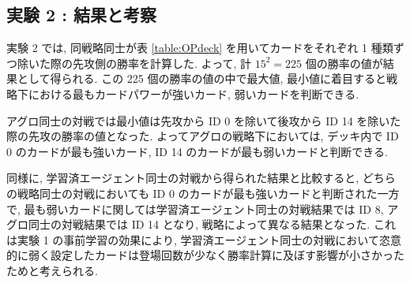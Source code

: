 \documentclass[twocolumn]{jarticle}     %
\begin{document}
         \subsection{実験 2 : 結果と考察}
         実験 2 では, 同戦略同士が表 \ref{table:OPdeck} を用いてカードをそれぞれ 1 種類ずつ除いた際の先攻側の勝率を計算した. よって, 計 $15^2 = 225$ 個の勝率の値が結果として得られる. この 225 個の勝率の値の中で最大値, 最小値に着目すると戦略下における最もカードパワーが強いカード, 弱いカードを判断できる.
         \par
         アグロ同士の対戦では最小値は先攻から ID 0 を除いて後攻から ID 14 を除いた際の先攻の勝率の値となった. よってアグロの戦略下においては, デッキ内で ID 0 のカードが最も強いカード, ID 14 のカードが最も弱いカードと判断できる. 
         \par
         同様に,  学習済エージェント同士の対戦から得られた結果と比較すると, どちらの戦略同士の対戦においても ID 0 のカードが最も強いカードと判断された一方で, 最も弱いカードに関しては学習済エージェント同士の対戦結果では ID 8, アグロ同士の対戦結果では ID 14 となり, 戦略によって異なる結果となった. これは実験 1 の事前学習の効果により, 学習済エージェント同士の対戦において恣意的に弱く設定したカードは登場回数が少なく勝率計算に及ぼす影響が小さかったためと考えられる. 
      
\end{document}

